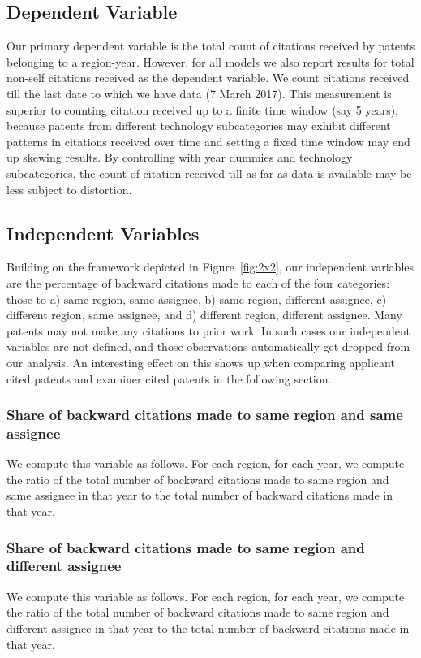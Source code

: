 \documentclass[12pt,letterpaper]{article}
\begin{document}
\subsection{Dependent Variable}
Our primary dependent variable is the  total count of citations received by patents belonging to a region-year. However, for all models we also report results for total non-self citations received as the dependent variable. We count citations received till the last date to which we have data (7 March 2017). This measurement is superior to counting citation received up to a finite time window (say 5 years), because patents from different technology subcategories may exhibit different patterns in citations received over time and setting a fixed time window may end up skewing results. By controlling with year dummies and technology subcategories, the count of citation received till as far as data is available may be less subject to distortion.

\subsection{Independent Variables}
Building on the framework depicted in Figure~\ref{fig:2x2}, our independent variables are the percentage of backward citations made to each of the four categories: those to a) same region, same assignee, b) same region, different assignee, c) different region, same assignee, and d) different region, different assignee. Many patents may not make any citations to prior work. In such cases our independent variables are not defined, and those observations automatically get dropped from our analysis. An interesting effect on this shows up when comparing applicant cited patents and examiner cited patents in the following section. \par
\subsubsection{Share of backward citations made to same region and same assignee}
We compute this variable as follows. For each region, for each year, we compute the ratio of the total number of backward citations made to same region and same assignee in that year to the total number of backward citations made in that year.
\subsubsection{Share of backward citations made to same region and different assignee}
We compute this variable as follows. For each region, for each year, we compute the ratio of the total number of backward citations made to same region and different assignee in that year to the total number of backward citations made in that year.
\end{document}
